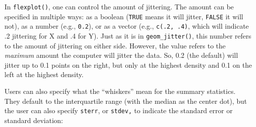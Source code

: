 \documentclass[
  doc]{apa6}
\begin{document}
In \texttt{flexplot()}, one can control the amount of jittering. The amount can be specified in multiple ways: as a boolean (\texttt{TRUE} means it will jitter, \texttt{FALSE} it will not), as a number (e.g., \texttt{0.2}), or as a vector (e.g., \texttt{c(.2,\ .4)}, which will indicate .2 jittering for X and .4 for Y). Just as it is in \texttt{geom\_jitter()}, this number refers to the amount of jittering on either side. However, the value refers to the \emph{maximum} amount the computer will jitter the data. So, 0.2 (the default) will jitter up to 0.1 points on the right, but only at the highest density and 0.1 on the left at the highest density.

Users can also specify what the \enquote{whiskers} mean for the summary statistics. They default to the interquartile range (with the median as the center dot), but the user can also specify \texttt{sterr}, or \texttt{stdev,} to indicate the standard error or standard deviation:
\end{document}
